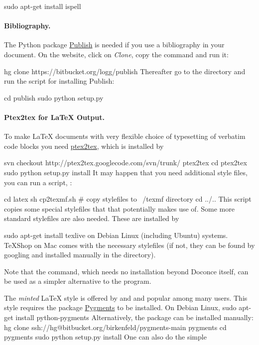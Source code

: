 \documentclass[%
oneside,                 %
final,                   %
10pt]{article}
\begin{document}
\bsys
sudo apt-get install ispell
\esys


\paragraph{Bibliography.}
The Python package \href{{https://bitbucket.org/logg/publish}}{Publish} is needed if you use a bibliography
in your document. On the website, click on \emph{Clone}, copy the
command and run it:

\bsys
hg clone https://bitbucket.org/logg/publish
\esys
Thereafter go to the  directory and run the  script
for installing Publish:

\bsys
cd publish
sudo python setup.py
\esys


\paragraph{Ptex2tex for {\LaTeX} Output.}
To make {\LaTeX} documents with very flexible choice of typesetting of
verbatim code blocks you need \href{{http://code.google.com/p/ptex2tex}}{ptex2tex},
which is installed by

\bsys
svn checkout http://ptex2tex.googlecode.com/svn/trunk/ ptex2tex
cd ptex2tex
sudo python setup.py install
\esys
It may happen that you need additional style files, you can run
a script, :

\bsys
cd latex
sh cp2texmf.sh  # copy stylefiles to ~/texmf directory
cd ../..
\esys
This script copies some special stylefiles that
that  potentially makes use of. Some more standard stylefiles
are also needed. These are installed by

\bsys
sudo apt-get install texlive
\esys
on Debian Linux (including Ubuntu) systems. TeXShop on Mac comes with
the necessary stylefiles (if not, they can be found by googling and installed
manually in the  directory).

Note that the  command, which needs no installation
beyond Doconce itself, can be used as a simpler alternative to the 
program.

The \emph{minted} {\LaTeX} style is offered by  and 
and popular among many
users. This style requires the package \href{{http://pygments.org}}{Pygments}
to be installed. On Debian Linux,
\bsys
sudo apt-get install python-pygments
\esys
Alternatively, the package can be installed manually:
\bsys
hg clone ssh://hg@bitbucket.org/birkenfeld/pygments-main pygments
cd pygments
sudo python setup.py install
\esys
One can also do the simple
\end{document}
